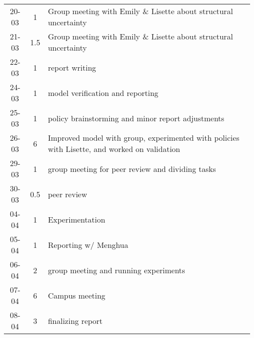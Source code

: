 \begin{longtable}[c]{c|c|m{35em}}
20-03 & 1 & Group meeting with Emily \& Lisette about structural uncertainty \\
21-03 & 1.5 & Group meeting with Emily \& Lisette about structural uncertainty \\
22-03 & 1 & report writing \\
24-03 & 1 & model verification and reporting \\
25-03 & 1 & policy brainstorming and minor report adjustments \\
26-03 & 6 & Improved model with group, experimented with policies with Lisette, and worked on validation \\
29-03 & 1 & group meeting for peer review and dividing tasks\\
30-03 & 0.5 & peer review \\
04-04 & 1 & Experimentation \\
05-04 & 1 & Reporting w/ Menghua \\
06-04 & 2 & group meeting and running experiments \\
07-04 & 6 & Campus meeting \\ 
08-04 & 3 & finalizing report \\
\end{longtable}

